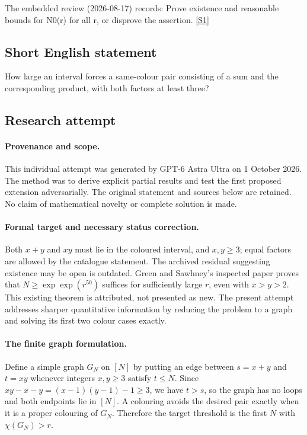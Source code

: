 \documentclass[11pt,a4paper]{article}
\newcommand{\sref}[2]{\hyperlink{source:#1:#2}{[S#2]}}
\begin{document}
The embedded review (2026-08-17) records: Prove existence and reasonable bounds for N0(r) for all r, or disprove the assertion. \sref{statement}{1}

\subsection{Short English statement}

How large an interval forces a same-colour pair consisting of a sum and the corresponding product, with both factors at least three?

\subsection{Research attempt}

\paragraph{Provenance and scope.}
This individual attempt was generated by GPT-6 Astra Ultra on 1 October 2026. The method was to derive explicit partial results and test the first proposed extension adversarially. The original statement and sources below are retained. No claim of mathematical novelty or complete solution is made.

\paragraph{Formal target and necessary status correction.}
Both $x+y$ and $xy$ must lie in the coloured interval, and $x,y\geq3$; equal factors are allowed by the catalogue statement. The archived residual suggesting existence may be open is outdated. Green and Sawhney's inspected paper proves that $N\geq\exp\exp(r^{50})$ suffices for sufficiently large $r$, even with $x>y>2$. This existing theorem is attributed, not presented as new. The present attempt addresses sharper quantitative information by reducing the problem to a graph and solving its first two colour cases exactly.

\paragraph{The finite graph formulation.}
Define a simple graph $G_N$ on $[N]$ by putting an edge between $s=x+y$ and $t=xy$ whenever integers $x,y\geq3$ satisfy $t\leq N$. Since $xy-x-y=(x-1)(y-1)-1\geq3$, we have $t>s$, so the graph has no loops and both endpoints lie in $[N]$. A colouring avoids the desired pair exactly when it is a proper colouring of $G_N$. Therefore the target threshold is the first $N$ with $\chi(G_N)>r$.
\end{document}
